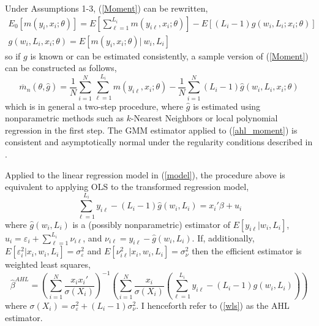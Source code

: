\documentclass[12pt]{article}
\begin{document}
Under Assumptions 1-3, (\ref{Moment}) can be rewritten,
\begin{gather*}
E_0[m(y_i, x_i; \theta)] = E\left[\sum_{\ell=1}^{L_i} m(y_{i\ell}, x_i; \theta)\right] - E\left[(L_i -1)g(w_i, L_i; x_i; \theta)\right] \\ 
g(w_i, L_i, x_i; \theta) = E\left[m(y_i, x_i; \theta) |\ w_i, L_i \right] 
\end{gather*}
so if $g$ is known or can be estimated consistently, a sample version of (\ref{Moment}) can be constructed as follows,
\begin{equation}
\overline{m}_n(\theta, \hat{g}) = \frac{1}{N}\sum_{i=1}^N \sum_{\ell=1}^{L_i} m(y_{i\ell}, x_i ;\theta) - \frac{1}{N}\sum_{i=1}^N (L_i-1) \hat{g}(w_i, L_i, x_i; \theta) 
\label{ahl_moment}
\end{equation}
which is in general a two-step procedure, where $\hat{g}$ is estimated using nonparametric methods such as $k$-Nearest Neighbors or local polynomial regression in the first step.  The GMM estimator applied to (\ref{ahl_moment}) is consistent and asymptotically normal under the regularity conditions described in \citet*{ahl2019}. 

Applied to the linear regression model in (\ref{model}), the procedure above is equivalent to applying OLS to the transformed regression model, 
\begin{equation} 
\sum_{\ell=1}^{L_i} y_{i\ell} - (L_i - 1)\hat{g}(w_i, L_i) = x_i'\beta + u_i  \label{ahl} \end{equation}
where $\hat{g}(w_i,L_i)$ is a (possibly nonparametric) estimator of $E[y_{i\ell} | w_i, L_i ]$, $u_i = \varepsilon_i + \sum_{\ell=1}^{L_i}\nu_{i\ell}$, and $\nu_{i\ell} = y_{i\ell} - \hat{g}(w_i, L_i)$.   If, additionally, $E[\varepsilon_i^2 | x_i, w_i, L_i] = \sigma_{\varepsilon}^2$ and $E[\nu_{i\ell}^2 | x_i, w_i, L_i] = \sigma_{\nu}^2$ then the efficient estimator is weighted least squares,
\begin{equation}
\hat{\beta}^{AHL} = \left(\sum_{i=1}^N \frac{x_ix_i'}{\sigma(X_i)}\right)^{-1}\left(\sum_{i=1}^N \frac{x_i}{\sigma(X_i)}\left(\sum_{\ell=1}^{L_i} y_{i\ell} - (L_i - 1) g(w_i, L_i)\right)\right) \label{wls}
\end{equation}
where $\sigma(X_i) = \sigma_{\varepsilon}^2 + (L_i - 1)\sigma_{\nu}^2$.  I henceforth refer to (\ref{wls}) as the AHL estimator. 
\end{document}
